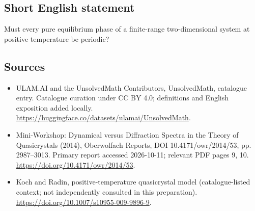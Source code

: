 \documentclass[11pt]{article}
\begin{document}
\subsection{Short English statement}
Must every pure equilibrium phase of a finite-range two-dimensional system at positive temperature be periodic?
\subsection{Sources}
\begin{itemize}
\item[\hypertarget{source:statement:1}{S1}] ULAM.AI and the UnsolvedMath Contributors, UnsolvedMath, catalogue entry. Catalogue curation under CC BY 4.0; definitions and English exposition added locally.
\url{https://huggingface.co/datasets/ulamai/UnsolvedMath}.
\item[\hypertarget{source:statement:2}{S2}] Mini-Workshop: Dynamical versus Diffraction Spectra in the Theory of Quasicrystals (2014), Oberwolfach Reports, DOI 10.4171/owr/2014/53, pp. 2987--3013. Primary report accessed 2026-10-11; relevant PDF pages 9, 10.
\url{https://doi.org/10.4171/owr/2014/53}.
\item[\hypertarget{source:statement:3}{S3}] Koch and Radin, positive-temperature quasicrystal model (catalogue-listed context; not independently consulted in this preparation).
\url{https://doi.org/10.1007/s10955-009-9896-9}.
\end{itemize}
\label{end:statement}
\end{document}
